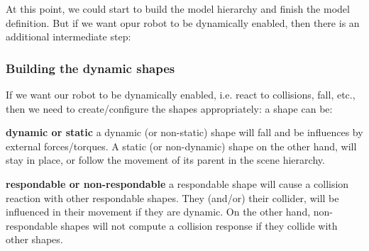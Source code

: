 
At this point, we could start to build the model hierarchy and finish the 
model definition. But if we want opur robot to be dynamically enabled, then 
there is an additional intermediate step:

\subsubsection{Building the dynamic shapes}

If we want our robot to be dynamically enabled, i.e. react to collisions, fall,
etc., then we need to create/configure the shapes appropriately: a shape can be:
\begin{description}
	\item{\textbf{dynamic or static}}
	a dynamic (or non-static) shape will fall and be influences by external
	forces/torques. A static (or non-dynamic) shape on the other hand, will 
	stay in place, or follow the movement of its parent in the scene hierarchy.
	\item{\textbf{respondable or non-respondable}}
	a respondable shape will cause a collision reaction with other respondable 
	shapes. They (and/or) their collider, will be influenced in their movement 
	if they are dynamic. On the other hand, non-respondable shapes will not 
	compute a collision response if they collide with other shapes.
\end{description}


